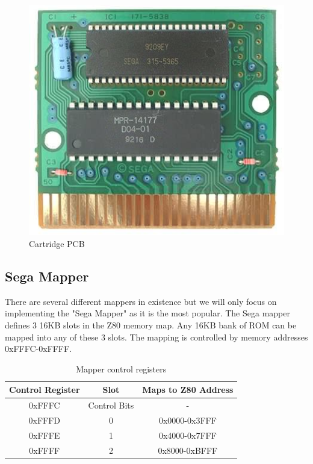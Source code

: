 \documentclass{article}
\begin{document}
\begin{figure}[H]
\begin{minipage}[H]{0.3\linewidth}
        \includegraphics[width=\textwidth]{gg_cart_pcb.png}
        \caption{Cartridge PCB \protect\cite{gg_cart_pcb}}
        \label{fig:gg_cart_pcb}
    \end{minipage}
\end{figure}

\subsection{Sega Mapper}
There are several different mappers in existence but we will only
focus on implementing the "Sega Mapper" as it is the most popular.
The Sega mapper defines 3 16KB slots in the Z80 memory map. Any 16KB bank
of ROM can be mapped into any of these 3 slots. The mapping is
controlled by memory addresses 0xFFFC-0xFFFF.

\begin{table}[H]
    \centering
    \begin{tabular}{|c|c|c|}
        \hline
        \textbf{Control Register} & \textbf{Slot}     & \textbf{Maps to Z80 Address} \\ \hline
        0xFFFC           & Control Bits & -              \\ \hline
        0xFFFD           & 0            & 0x0000-0x3FFF  \\ \hline
        0xFFFE           & 1            & 0x4000-0x7FFF  \\ \hline
        0xFFFF           & 2            & 0x8000-0xBFFF  \\
        \hline
    \end{tabular}
    \caption{Mapper control registers \protect\cite{mapper}}
\end{table}
\end{document}
